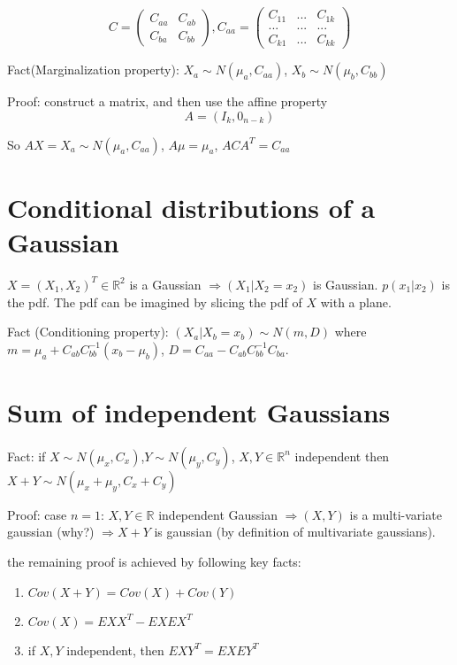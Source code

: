 \documentclass[12pt]{article}
\begin{document}
\begin{equation}
    C=\begin{pmatrix}
        C_{aa} & C_{ab} \\
        C_{ba} & C_{bb}
    \end{pmatrix}
,
    C_{aa}=\begin{pmatrix}
        C_{11} & ... & C_{1k} \\
        ... & ... & ... \\
        C_{k1} & ... & C_{kk}
    \end{pmatrix}
\end{equation}

Fact(Marginalization property): 
$X_a\sim N(\mu_a, C_{aa})$,
$X_b\sim N(\mu_b, C_{bb})$

Proof: construct a matrix, and then use the affine property
\begin{equation}
    A=(I_k, 0_{n-k})
\end{equation}

So $AX=X_a\sim N(\mu_a, C_{aa})$, $A\mu=\mu_a$, $ACA^T=C_{aa}$

\section{Conditional distributions of a Gaussian}

$X=(X_1,X_2)^T\in\mathbb{R}^2$ is a Gaussian $\Rightarrow (X_1|X_2=x_2)$ is Gaussian.
$p(x_1|x_2)$ is the pdf. The pdf can be imagined by slicing the pdf of $X$ with a plane.

Fact (Conditioning property):
$(X_a|X_b=x_b)\sim N(m,D)$ where $m=\mu_a + C_{ab}C_{bb}^{-1}(x_b-\mu_b)$,
$D=C_{aa}-C_{ab}C_{bb}^{-1}C_{ba}$.

\section{Sum of independent Gaussians}

Fact: if $X\sim N(\mu_x,C_x)$,$Y\sim N(\mu_y,C_y)$, $X,Y\in\mathbb{R}^n$ independent
then $X + Y \sim N(\mu_x + \mu_y, C_x + C_y)$

Proof: case $n=1$: $X,Y\in\mathbb{R}$ independent Gaussian $\Rightarrow (X,Y)$
is a multi-variate gaussian (why?) $\Rightarrow X+Y$ is gaussian (by definition
of multivariate gaussians).

the remaining proof is achieved by following key facts:
\begin{enumerate}
    \item $Cov(X+Y)=Cov(X)+Cov(Y)$

    \item $Cov(X)=EXX^T-EXEX^T$

    \item if $X,Y$ independent, then $EXY^T=EXEY^T$
\end{enumerate}
\end{document}
